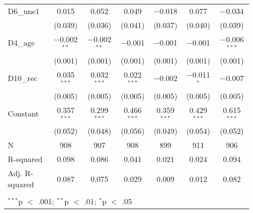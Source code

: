 \documentclass[
]{article}
\begin{document}
\begin{table}[!htbp]
\begin{tabular}{@{\extracolsep{5pt}}lcccccc}
  D6\_une1 & 0.015 & 0.052 & 0.049 & $-$0.018 & 0.077 & $-$0.034 \\ 
  & (0.039) & (0.036) & (0.041) & (0.037) & (0.040) & (0.039) \\ 
  D4\_age & $-$0.002$^{**}$ & $-$0.002$^{**}$ & $-$0.001 & $-$0.001 & $-$0.001 & $-$0.006$^{***}$ \\ 
  & (0.001) & (0.001) & (0.001) & (0.001) & (0.001) & (0.001) \\ 
  D10\_rec & 0.035$^{***}$ & 0.032$^{***}$ & 0.022$^{***}$ & $-$0.002 & $-$0.011$^{*}$ & $-$0.007 \\ 
  & (0.005) & (0.005) & (0.005) & (0.005) & (0.005) & (0.005) \\ 
  Constant & 0.357$^{***}$ & 0.299$^{***}$ & 0.466$^{***}$ & 0.359$^{***}$ & 0.429$^{***}$ & 0.615$^{***}$ \\ 
  & (0.052) & (0.048) & (0.056) & (0.049) & (0.054) & (0.052) \\ 
 N & 908 & 907 & 908 & 899 & 911 & 906 \\ 
R-squared & 0.098 & 0.086 & 0.041 & 0.021 & 0.024 & 0.094 \\ 
Adj. R-squared & 0.087 & 0.075 & 0.029 & 0.009 & 0.012 & 0.082 \\ 
\hline \\[-1.8ex] 
\multicolumn{7}{l}{$^{***}$p $<$ .001; $^{**}$p $<$ .01; $^{*}$p $<$ .05} \\ 
\end{tabular} 
\end{table}
\end{document}
